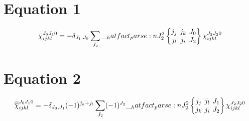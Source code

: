 \documentclass{scrartcl}
\newcommand{\sixj}[6]{\begingroup\setlength{\arraycolsep}{0.2em}\begin{Bmatrix} #1 & #2 & #3 \\ #4 & #5 & #6 \end{Bmatrix}\endgroup}
\begin{document}
\section{Equation 1}
\begin{dmath*}
\bar{\chi}_{i j k l}^{{J}_{0} {J}_{1} 0} = -\delta_{{J}_{1},{J}_{0}} \* \sum_{{J}_{2}} \* \hatfact{{J}_{2}^{2}} \* \sixj{{j}_{j}}{{j}_{k}}{{J}_{0}}{{j}_{l}}{{j}_{i}}{{J}_{2}} \* \chi_{i j k l}^{{J}_{2} {J}_{2} 0}
\end{dmath*}

\section{Equation 2}
\begin{dmath*}
\overline{\overline{\chi}}_{i j k l}^{{J}_{0} {J}_{1} 0} = -\delta_{{J}_{0},{J}_{1}} \* (-1)^{{j}_{k}+{j}_{l}} \* \sum_{{J}_{2}} \* (-1)^{{J}_{2}} \* \hatfact{{J}_{2}^{2}} \* \sixj{{j}_{j}}{{j}_{l}}{{J}_{1}}{{j}_{k}}{{j}_{i}}{{J}_{2}} \* \chi_{i j k l}^{{J}_{2} {J}_{2} 0}
\end{dmath*}
\end{document}
